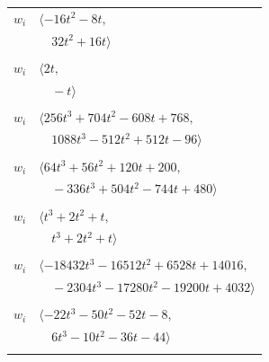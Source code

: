 \documentclass[11pt]{article}
\begin{document}
\begin{longtable}{@{}ll@{}}
$w_i$ & $\langle -16t^{2}-8t,$\\
 & $\quad 32t^{2}+16t\rangle$\\
\addlinespace[2pt]
\multicolumn{2}{@{}p{0.97\textwidth}@{}}{$i=52$, $D_i=1$, $\rho_{ij}$: $9{:}2, \allowbreak 10{:}2, \allowbreak 15{:}2, \allowbreak 35{:}2, \allowbreak 54{:}2$}\\
$w_i$ & $\langle 2t,$\\
 & $\quad -t\rangle$\\
\addlinespace[2pt]
\multicolumn{2}{@{}p{0.97\textwidth}@{}}{$i=53$, $D_i=2$, $e_i=0$, $\rho_{ij}$: $0{:}1, \allowbreak 3{:}2, \allowbreak 12{:}3, \allowbreak 20{:}2, \allowbreak 23{:}2, \allowbreak 26{:}3, \allowbreak 29{:}3, \allowbreak 32{:}3, \allowbreak 44{:}2, \allowbreak 45{:}1, \allowbreak 47{:}1, \allowbreak 50{:}2, \allowbreak 54{:}1$}\\
$w_i$ & $\langle 256t^{3}+704t^{2}-608t+768,$\\
 & $\quad 1088t^{3}-512t^{2}+512t-96\rangle$\\
\addlinespace[2pt]
\multicolumn{2}{@{}p{0.97\textwidth}@{}}{$i=54$, $D_i=1$, $\rho_{ij}$: $1{:}2, \allowbreak 7{:}3, \allowbreak 12{:}1, \allowbreak 25{:}3, \allowbreak 31{:}2, \allowbreak 32{:}1, \allowbreak 40{:}1, \allowbreak 41{:}2, \allowbreak 42{:}2, \allowbreak 44{:}2, \allowbreak 45{:}2, \allowbreak 51{:}2, \allowbreak 52{:}2, \allowbreak 53{:}3, \allowbreak 56{:}2$}\\
$w_i$ & $\langle 64t^{3}+56t^{2}+120t+200,$\\
 & $\quad -336t^{3}+504t^{2}-744t+480\rangle$\\
\addlinespace[2pt]
\multicolumn{2}{@{}p{0.97\textwidth}@{}}{$i=55$, $D_i=1$, $\rho_{ij}$: $3{:}3, \allowbreak 11{:}1, \allowbreak 12{:}2, \allowbreak 15{:}3, \allowbreak 22{:}1, \allowbreak 24{:}1, \allowbreak 26{:}2, \allowbreak 36{:}1, \allowbreak 57{:}3$}\\
$w_i$ & $\langle t^{3}+2t^{2}+t,$\\
 & $\quad t^{3}+2t^{2}+t\rangle$\\
\addlinespace[2pt]
\multicolumn{2}{@{}p{0.97\textwidth}@{}}{$i=56$, $D_i=8$, $e_i=0$, $\rho_{ij}$: $0{:}2, \allowbreak 3{:}2, \allowbreak 20{:}1, \allowbreak 21{:}2, \allowbreak 22{:}3, \allowbreak 25{:}2, \allowbreak 28{:}1, \allowbreak 29{:}3, \allowbreak 31{:}2, \allowbreak 32{:}1, \allowbreak 36{:}1, \allowbreak 39{:}3, \allowbreak 40{:}3, \allowbreak 54{:}2$}\\
$w_i$ & $\langle -18432t^{3}-16512t^{2}+6528t+14016,$\\
 & $\quad -2304t^{3}-17280t^{2}-19200t+4032\rangle$\\
\addlinespace[2pt]
\multicolumn{2}{@{}p{0.97\textwidth}@{}}{$i=57$, $D_i=1$, $\rho_{ij}$: $5{:}1, \allowbreak 22{:}2, \allowbreak 25{:}3, \allowbreak 37{:}1, \allowbreak 39{:}3, \allowbreak 40{:}2, \allowbreak 42{:}1, \allowbreak 55{:}1$}\\
$w_i$ & $\langle -22t^{3}-50t^{2}-52t-8,$\\
 & $\quad 6t^{3}-10t^{2}-36t-44\rangle$\\
\addlinespace[2pt]
\end{longtable}
\endgroup
\end{document}
